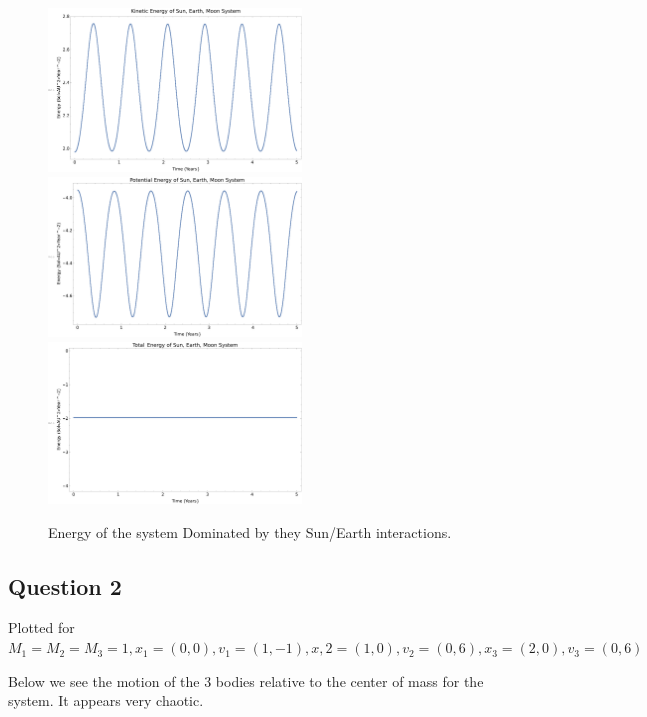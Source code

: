 \documentclass{article}
\begin{document}
\begin{figure}[!htb]
	\begin{center}
		\includegraphics[width=0.6\textwidth]{images/p1-4d.pdf}
		\includegraphics[width=0.6\textwidth]{images/p1-4e.pdf}
		\includegraphics[width=0.6\textwidth]{images/p1-4f.pdf}
	\end{center}
	\caption{Energy of the system Dominated by they Sun/Earth interactions.}
\label{fig:qual}
\end{figure}
\FloatBarrier

\subsection{Question 2}

Plotted for $M_1 = M_2 = M_3 = 1, x_1=(0,0), v_1 = (1,-1), x,2 = (1,0), v_2 = (0,6), x_3=(2,0), v_3=(0,6)$ 

Below we see the motion of the 3 bodies relative to the center of mass for the system. It appears very chaotic.
\end{document}
